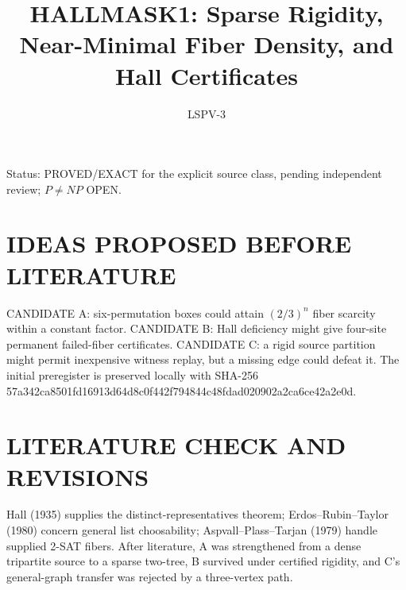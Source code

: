 \documentclass{article}
\title{HALLMASK1: Sparse Rigidity, Near-Minimal Fiber Density, and Hall Certificates}
\author{LSPV-3}
\begin{document}
\maketitle
\noindent Status: PROVED/EXACT for the explicit source class, pending independent review; $P\ne NP$ OPEN.
\section{IDEAS PROPOSED BEFORE LITERATURE}
CANDIDATE A: six-permutation boxes could attain $(2/3)^n$ fiber scarcity within a constant factor. CANDIDATE B: Hall deficiency might give four-site permanent failed-fiber certificates. CANDIDATE C: a rigid source partition might permit inexpensive witness replay, but a missing edge could defeat it. The initial preregister is preserved locally with SHA-256 57a342ca8501fd16913d64d8c0f442f794844c48fdad020902a2ca6ce42a2e0d.
\section{LITERATURE CHECK AND REVISIONS}
Hall (1935) supplies the distinct-representatives theorem; Erdos--Rubin--Taylor (1980) concern general list choosability; Aspvall--Plass--Tarjan (1979) handle supplied 2-SAT fibers. After literature, A was strengthened from a dense tripartite source to a sparse two-tree, B survived under certified rigidity, and C's general-graph transfer was rejected by a three-vertex path.
\end{document}

